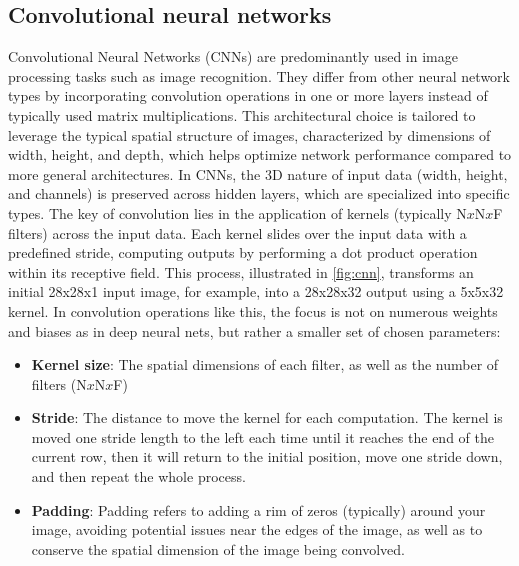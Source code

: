 

\subsection{Convolutional neural networks}

Convolutional Neural Networks (CNNs) are predominantly used in image processing tasks such as image recognition. They differ from other neural network types by incorporating convolution operations in one or more layers instead of typically used matrix multiplications. This architectural choice is tailored to leverage the typical spatial structure of images, characterized by dimensions of width, height, and depth, which helps optimize network performance compared to more general architectures. In CNNs, the 3D nature of input data (width, height, and channels) is preserved across hidden layers, which are specialized into specific types. The key of convolution lies in the application of kernels (typically N$x$N$x$F filters) across the input data. Each kernel slides over the input data with a predefined stride, computing outputs by performing a dot product operation within its receptive field. This process, illustrated in \autoref{fig:cnn}, transforms an initial 28x28x1 input image, for example, into a 28x28x32 output using a 5x5x32 kernel. In convolution operations like this, the focus is not on numerous weights and biases as in deep neural nets, but rather a smaller set of chosen parameters: 

\begin{itemize}
 \item \textbf{Kernel size}: The spatial dimensions of each filter, as well as the number of filters (N$x$N$x$F)
 \item \textbf{Stride}: The distance to move the kernel for each computation. The kernel is moved one stride length to the left each time until it reaches the end of the current row, then it will return to the initial position, move one stride down, and then repeat the whole process.
 \item \textbf{Padding}: Padding refers to adding a rim of zeros (typically) around your image, avoiding potential issues near the edges of the image, as well as to conserve the spatial dimension of the image being convolved.
\end{itemize}

